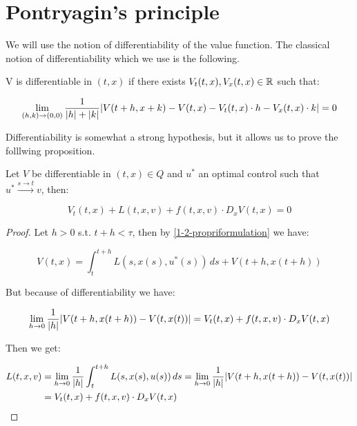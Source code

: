 \section{Pontryagin's principle}

We will use the notion of differentiability of the value function. 
The classical notion of differentiability which we use is the following.

\begin{definition}
    V is differentiable in $(t,x)$ if there exists $V_t(t,x),V_x(t,x)\in\mathbb{R}$ such that:

    \begin{equation}
        \lim_{(h,k)\to(0,0)} \frac{1}{\abs{h}+\abs{k}}\abs{V(t+h,x+k)-V(t,x)-V_t(t,x)\cdot h-V_x(t,x)\cdot k}=0
    \end{equation}
\end{definition}

Differentiability is somewhat a strong hypothesis, but it allows us to prove the folllwing
proposition.

\begin{theorem}
    Let $V$ be differentiable in $(t,x)\in Q$ and $u^{\ast}$ an optimal control
    such that $u^{\ast}\xrightarrow{s\to t}v$, then:

    \begin{equation}\label{1-3-dynamicprogrammeq}
        V_t(t,x) + L(t,x,v) + f(t,x,v)\cdot D_xV(t,x) = 0
    \end{equation}

    \begin{proof}
        Let $h>0$ s.t. $t+h<\tau$, then by \ref{1-2-propriformulation} we have:

        \[ V(t,x) = \int_t^{t+h} L(s,x(s),u^{\ast}(s)) \,ds + V(t+h,x(t+h))\]

        But because of differentiability we have:

        \[\lim_{h\to0}\frac{1}{\abs{h}}\abs{V(t+h,x(t+h))-V(t,x(t))} = V_t(t,x) + f(t,x,v)\cdot D_xV(t,x)\]

        Then we get:

        \begin{align}
        L(t,x,v) & = \lim_{h\to0} \frac{1}{\abs{h}} \int_t^{t+h} L(s,x(s),u(s)) \,ds = \lim_{h\to0} \frac{1}{\abs{h}}\abs{V(t+h,x(t+h))-V(t,x(t))} \\
        & = V_t(t,x) + f(t,x,v)\cdot D_xV(t,x)
        \end{align}
    \end{proof}
\end{theorem}